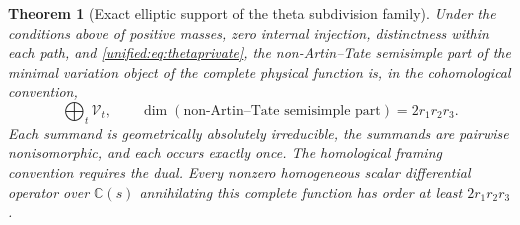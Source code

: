 \documentclass[11pt,a4paper,oneside]{article}
\theoremstyle{plain}
\newtheorem{theorem}{Theorem}[section]
\theoremstyle{definition}
\theoremstyle{remark}
\numberwithin{equation}{section}
\begin{document}
\begin{theorem}[Exact elliptic support of the theta subdivision family]\label{unified:thm:thetavisible}
Under the conditions above of positive masses, zero internal injection, distinctness within each path, and \eqref{unified:eq:thetaprivate},
the non-Artin--Tate semisimple part of the minimal variation object of the complete physical function is, in the cohomological convention,
\begin{equation}\label{unified:eq:thetass}
       \bigoplus_t\mathcal V_t,\qquad
       \dim(\text{non-Artin--Tate semisimple part})=2r_1r_2r_3 .
\end{equation}
Each summand is geometrically absolutely irreducible, the summands are pairwise nonisomorphic, and each occurs exactly once.
The homological framing convention requires the dual. Every nonzero homogeneous scalar differential operator over $\mathbb C(s)$
annihilating this complete function has order at least $2r_1r_2r_3$.
\end{theorem}
\end{document}
